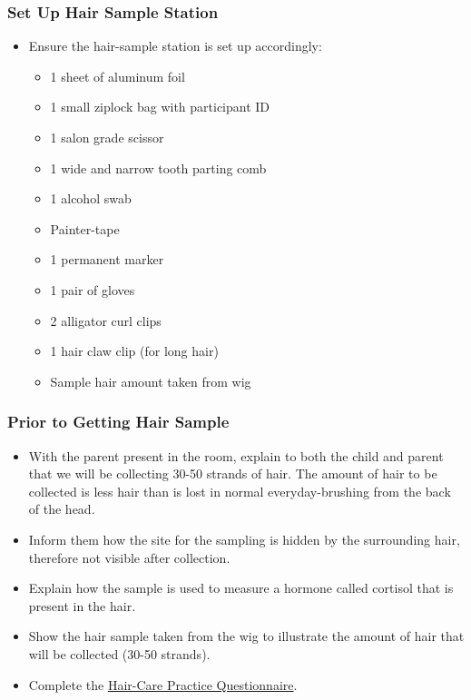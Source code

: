 \documentclass[
]{book}
\providecommand{\tightlist}{%
  \setlength{\itemsep}{0pt}\setlength{\parskip}{0pt}}
\begin{document}
\hypertarget{set-up-hair-sample-station}{%
\subsubsection{Set Up Hair Sample Station}\label{set-up-hair-sample-station}}

\begin{itemize}
\tightlist
\item
  Ensure the hair-sample station is set up accordingly:

  \begin{itemize}
  \tightlist
  \item
    1 sheet of aluminum foil
  \item
    1 small ziplock bag with participant ID
  \item
    1 salon grade scissor
  \item
    1 wide and narrow tooth parting comb
  \item
    1 alcohol swab
  \item
    Painter-tape
  \item
    1 permanent marker
  \item
    1 pair of gloves
  \item
    2 alligator curl clips
  \item
    1 hair claw clip (for long hair)
  \item
    Sample hair amount taken from wig
  \end{itemize}
\end{itemize}

\hypertarget{prior-to-getting-hair-sample}{%
\subsubsection{Prior to Getting Hair Sample}\label{prior-to-getting-hair-sample}}

\begin{itemize}
\tightlist
\item
  With the parent present in the room, explain to both the child and parent that we will be collecting 30-50 strands of hair. The amount of hair to be collected is less hair than is lost in normal everyday-brushing from the back of the head.
\item
  Inform them how the site for the sampling is hidden by the surrounding hair, therefore not visible after collection.
\item
  Explain how the sample is used to measure a hormone called cortisol that is present in the hair.
\item
  Show the hair sample taken from the wig to illustrate the amount of hair that will be collected (30-50 strands).
\item
  Complete the \href{https://app.box.com/file/630323877918}{Hair-Care Practice Questionnaire}.
\end{itemize}
\end{document}
